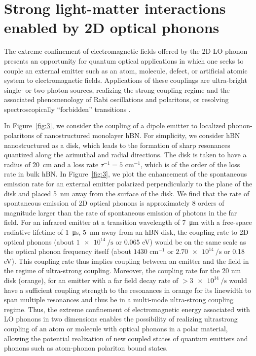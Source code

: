 \documentclass[aps,prb,twocolumn,
	           groupedaddress,superscriptaddress,
               amsfonts,amssymb,amsmath,floatfix,
	           citeautoscript]{revtex4-1}
\newcommand{\comment}[2]{%
    \ifbool{togglecomments}%
    {\textcolor{blue!70!black}{\small\textsf{%
    \textsuperscript{\textsc{\textsf{\MakeLowercase{#1}}}}%
    [#2]}}} %
    {}}     %
\begin{document}
\section{Strong light-matter interactions enabled by 2D optical phonons}

The extreme confinement of electromagnetic fields offered by the 2D LO phonon presents an opportunity for quantum optical applications in which one seeks to couple an external emitter such as an atom, molecule, defect, or artificial atomic system to electromagnetic fields. Applications of these couplings are ultra-bright single- or two-photon sources, realizing the strong-coupling regime and the associated phenomenology of Rabi oscillations and polaritons, or resolving spectroscopically ``forbidden'' transitions \cite{koppens2011graphene,autore2018boron,rivera2016shrinking,rivera2017making,kurman2018control}.

In Figure~\ref{fig:3}, we consider the coupling of a dipole emitter to localized phonon-polaritons of nanostructured monolayer hBN. For simplicity, we consider hBN nanostructured as a disk, which leads to the formation of sharp resonances quantized along the azimuthal and radial directions. The disk is taken to have a radius of \SI{20}{cm} and a loss rate $\tau^{-1} = 5$ cm$^{-1}$, which is of the order of the loss rate in bulk hBN. In Figure~\ref{fig:3}, we plot the enhancement of the spontaneous emission rate for an external emitter polarized perpendicularly to the plane of the disk and placed \SI{5}{\nm} away from the surface of the disk. We find that the rate of spontaneous emission of 2D optical phonons is approximately 8 orders of magnitude larger than the rate of spontaneous emission of photons in the far field. For an infrared emitter at a transition wavelength of \SI{7}{\micro\m} with a free-space radiative lifetime of \SI{1}{\micro\s}, \SI{5}{\nm} away from an hBN disk, the coupling rate to 2D optical phonons (about $\SI{1e14}{\per\s}$ or 0.065 eV) would be on the same scale as the optical phonon frequency itself (about $1430$ cm$^{-1}$ or $\SI{2.70e14}{\per\s}$ or 0.18 eV). This coupling rate thus implies coupling between an emitter and the field in the regime of ultra-strong coupling. Moreover, the coupling rate for the 20 nm disk (orange), for an emitter with a far field decay rate of $> \SI{3e14}{\per\s}$ would have a sufficient coupling strength to the resonances in orange for its linewidth to span multiple resonances and thus be in a multi-mode ultra-strong coupling regime. Thus, the extreme confinement of electromagnetic energy associated with LO phonons in two dimensions enables the possibility of realizing ultrastrong coupling of an atom or molecule with optical phonons in a polar material, allowing the potential realization of new coupled states of quantum emitters and phonons such as atom-phonon polariton bound states.
\end{document}
